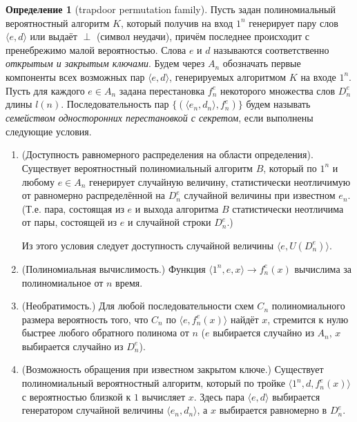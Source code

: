 \documentclass[12pt,a4paper]{article}
\theoremstyle{definition}
\newtheorem{definition}{Определение}[section]
\theoremstyle{plain}
\theoremstyle{remark}
\begin{document}
\begin{definition}[trapdoor permutation family]
Пусть задан полиномиальный вероятностный алгоритм $K$,
который получив на вход $1^n$ генерирует пару слов 
$\langle e, d \rangle$ или выдаёт $\perp$ (символ неудачи),
причём последнее происходит с пренебрежимо малой вероятностью.
Слова $e$ и $d$ называются соответственно \emph{открытым и закрытым ключами}. 
Будем через $A_n$ обозначать первые компоненты
всех возможных пар $\langle e,d\rangle$, генерируемых
алгоритмом $K$ на входе $1^n$. Пусть для каждого $e\in A_n$
задана перестановка $f_n^e$ некоторого множества слов $D_n^e$
длины $l(n)$. Последовательность пар 
$\{(\langle e_n, d_n\rangle, f_n^e )\}$
будем называть \emph{семейством односторонних перестановкой с секретом},
если выполнены следующие условия.
\begin{enumerate}
\item (Доступность равномерного распределения на области определения).
Существует вероятностный полиномиальный алгоритм $B$,
который по $1^n$ и любому $e\in A_n$ генерирует случайную
величину, статистически неотличимую от равномерно 
распределённой на $D_n^e$ случайной величины при известном $e_n$.
(Т.е. пара, состоящая из $e$ и выхода алгоритма $B$
статистически неотличима от пары, состоящей из $e$ и 
случайной строки $D_n^e$.)

Из этого условия следует доступность случайной величины $\langle e, U(D_n^e) \rangle.$

\item (Полиномиальная вычислимость.) Функция 
$\langle 1^n, e,x \rangle\to f_n^e(x)$ вычислима
за полиномиальное от $n$ время.

\item (Необратимость.) Для любой последовательности
схем $C_n$ полиномиального размера вероятность того,
что $C_n$ по $\langle e,f_n^e(x) \rangle$ найдёт $x$,
стремится к нулю быстрее любого обратного полинома от $n$
($e$ выбирается случайно из $A_n$, 
$x$ выбирается случайно из $D^e_n$).

\item (Возможность обращения при известном закрытом ключе.)
Существует полиномиальный вероятностный алгоритм, который
по тройке $\langle 1^n, d, f_n^e(x) \rangle$ с вероятностью
близкой к $1$ вычисляет $x$. Здесь пара
$\langle e,d \rangle$ выбирается генератором случайной
величины $\langle e_n,d_n \rangle$, а $x$ выбирается
равномерно в $D_n^e$.
\end{enumerate}
\end{definition}
\end{document}
